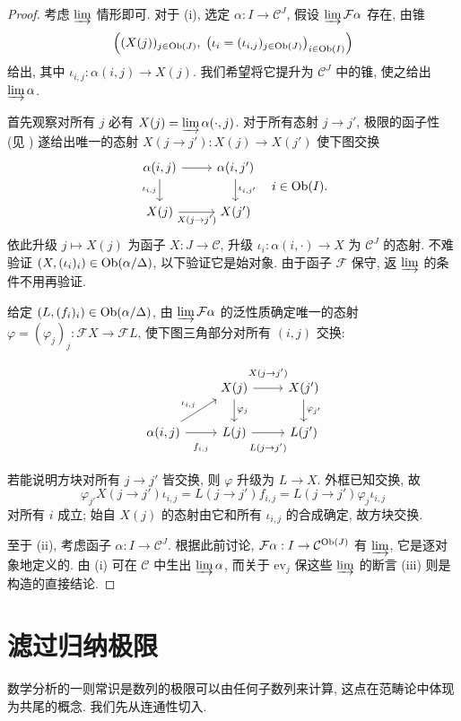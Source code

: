 \begin{proof}
	考虑 $\varinjlim$ 情形即可. 对于 (i), 选定 $\alpha: I \to \mathcal{C}^J$, 假设 $\varinjlim \mathcal{F}\alpha$ 存在, 由锥
	\[ \left( (X(j))_{j \in \operatorname{Ob}(J)}, \; \left( \iota_i = (\iota_{i, j})_{j \in \operatorname{Ob}(J)} \right)_{i \in \operatorname{Ob}(I)} \right) \]
	给出, 其中 $\iota_{i,j}: \alpha(i, j) \to X(j)$. 我们希望将它提升为 $\mathcal{C}^J$ 中的锥, 使之给出 $\varinjlim \alpha$.
	
	首先观察对所有 $j$ 必有 $X(j) = \varinjlim \alpha(\cdot, j)$. 对于所有态射 $j \to j'$, 极限的函子性 (见 \cite[引理 2.7.4]{Li1}) 遂给出唯一的态射 $X(j \to j'): X(j) \to X(j')$ 使下图交换
	\[\begin{tikzcd}
		\alpha(i, j) \arrow[r] \arrow[d, "{\iota_{i, j}}"'] & \alpha(i, j') \arrow[d, "{\iota_{i, j'}}"] \\
		X(j) \arrow[r, "{X(j \to j')}"'] & X(j')
	\end{tikzcd} \quad i \in \Obj(I). \]
	依此升级 $j \mapsto X(j)$ 为函子 $X: J \to \mathcal{C}$, 升级 $\iota_i: \alpha(i, \cdot) \to X$ 为 $\mathcal{C}^J$ 的态射. 不难验证 $(X, (\iota_i)_i) \in \operatorname{Ob}(\alpha/\Delta)$, 以下验证它是始对象. 由于函子 $\mathcal{F}$ 保守, 返 $\varinjlim$ 的条件不用再验证.

	给定 $(L, (f_i)_i) \in \operatorname{Ob}(\alpha/\Delta)$, 由 $\varinjlim \mathcal{F}\alpha$ 的泛性质确定唯一的态射 $\varphi = (\varphi_j)_j : \mathcal{F}X \to \mathcal{F}L$, 使下图三角部分对所有 $(i, j)$ 交换:
	\[\begin{tikzcd}
		& X(j) \arrow[d, "\varphi_j"] \arrow[r, "{X(j \to j')}" inner sep=0.8em] & X(j') \arrow[d, "\varphi_{j'}"] \\
		\alpha(i, j) \arrow[ru, "{\iota_{i,j}}"] \arrow[r, "f_{i, j}"' inner sep=0.8em] & L(j) \arrow[r, "{L(j \to j')}"' inner sep=0.8em] & L(j')
	\end{tikzcd}\]
	若能说明方块对所有 $j \to j'$ 皆交换, 则 $\varphi$ 升级为 $L \to X$. 外框已知交换, 故
	\[ \varphi_{j'} X(j \to j') \iota_{i, j} = L(j \to j') f_{i, j} = L(j \to j') \varphi_j \iota_{i, j} \]
	对所有 $i$ 成立; 始自 $X(j)$ 的态射由它和所有 $\iota_{i,j}$ 的合成确定, 故方块交换.

	至于 (ii), 考虑函子 $\alpha: I \to \mathcal{C}^J$. 根据此前讨论, $\mathcal{F}\alpha: I \to \mathcal{C}^{\operatorname{Ob}(J)}$ 有 $\varinjlim$, 它是逐对象地定义的. 由 (i) 可在 $\mathcal{C}$ 中生出 $\varinjlim \alpha$, 而关于 $\mathrm{ev}_j$ 保这些 $\varinjlim$ 的断言 (iii) 则是构造的直接结论.
\end{proof}

\section{滤过归纳极限}\label{sec:filtered-indlim}
数学分析的一则常识是数列的极限可以由任何子数列来计算, 这点在范畴论中体现为共尾的概念. 我们先从连通性切入.


